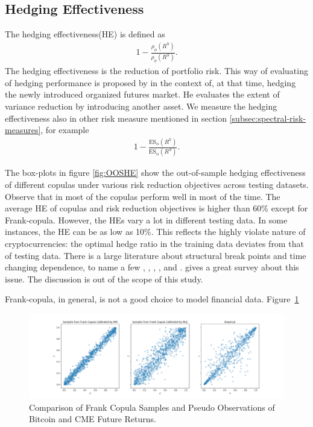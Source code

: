 \subsection{Hedging Effectiveness}\label{subsec:hedging-effectiveness}
The hedging effectiveness(HE) is defined as
\begin{align}
  1- \frac{\rho_\phi(R^h)}{\rho_\phi(R^S)}.
  \end{align}
The hedging effectiveness is the reduction of portfolio risk.
This way of evaluating of hedging performance is proposed by \cite{ederington1979hedging} in the context of, at that time, hedging the newly introduced
organized futures market.
He evaluates the extent of variance reduction by introducing another asset.
We measure the hedging effectiveness also in other risk measure mentioned in section \ref{subsec:spectral-risk-measures},
for example
\begin{align}
  1- \frac{\text{ES}_\alpha(R^h)}{\text{ES}_\alpha(R^S)}.
  \end{align}

The box-plots in figure \ref{fig:OOSHE} show the out-of-sample hedging effectiveness of different copulas under various risk
reduction objectives across testing datasets.
Observe that in most of the copulas perform well in most of the time.
The average HE of copulas and risk reduction objectives is higher than 60\% except for Frank-copula.
However, the HEs vary a lot in different testing data.
In some instances, the HE can be as low as 10\%.
This reflects the highly violate nature of cryptocurrencies:
the optimal hedge ratio in the training data deviates from that of testing data.
There is a large literature about structural break points and time changing dependence, to name a few
\citet{hafner2012dynamic}, \citet{patton2006modelling}, \citet{creal2008general},
\citet{engle2002dynamic}, and \citet{giacomini2009inhomogeneous}.
\citet{manner2012survey} gives a great survey about this issue.
The discussion is out of the scope of this study.\medskip

Frank-copula, in general, is not a good choice to model financial data.
Figure~\ref{fig:Frank}

\begin{figure}[th]
   \centering
   \includegraphics[width=\textwidth]{_pics/Frank.png}
   \caption{Comparison of Frank Copula Samples and Pseudo Observations of Bitcoin and CME Future Returns.
   }
   \label{fig:Frank}
\end{figure}

